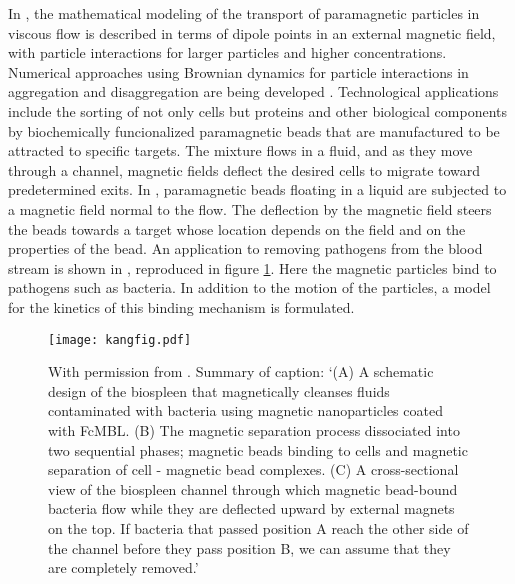 In \cite{Suh2011}, the mathematical modeling of the transport of 
paramagnetic particles 
in viscous flow is  described in terms of dipole points in an external 
magnetic field, with particle interactions for  larger particles and 
higher concentrations\cite{Banerjee2012}. Numerical 
approaches using Brownian dynamics for particle interactions in 
aggregation and disaggregation are being developed \cite{vanReenen2014}.
Technological applications  include the sorting of not only cells but proteins and other biological components by biochemically funcionalized paramagnetic beads that 
are manufactured to be attracted to specific targets. The mixture flows in a fluid, and as they move through a channel, magnetic fields deflect the desired cells to 
migrate toward predetermined exits.
In \cite{Tsai2011}, paramagnetic beads floating in a liquid are subjected to a magnetic field normal to the flow. The deflection by the magnetic field steers the 
beads towards a target whose location depends on the field and on the properties of the bead.  An application to removing pathogens from the blood stream is shown in 
\cite{small}, reproduced in figure \ref{kangfig}.  Here the magnetic particles bind to pathogens such as bacteria. In addition to the motion of the 
particles, a model for the kinetics of this binding mechanism is formulated.
\begin{figure}
\texttt{[image: kangfig.pdf]}
\caption{With permission from \cite{small}. Summary of caption:  `(A) A schematic design of the biospleen that magnetically cleanses fluids contaminated with 
bacteria using magnetic nanoparticles coated with FcMBL. (B) The magnetic separation process dissociated into two sequential phases; magnetic beads binding to cells 
and magnetic separation of cell - magnetic bead complexes.  (C) A cross-sectional view of the biospleen channel through which magnetic bead-bound bacteria flow while 
they are deflected upward  by external magnets on the top. If bacteria that passed position A reach the other side of the channel before they pass position B, we can 
assume that they are completely removed.'
}
\label{kangfig}\end{figure}



